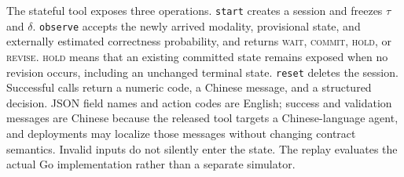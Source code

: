 \documentclass[journal]{IEEEtran}
\begin{document}
The stateful tool exposes three operations. \texttt{start} creates a session and freezes $\tau$ and $\delta$. \texttt{observe} accepts the newly arrived modality, provisional state, and externally estimated correctness probability, and returns \textsc{wait}, \textsc{commit}, \textsc{hold}, or \textsc{revise}. \textsc{hold} means that an existing committed state remains exposed when no revision occurs, including an unchanged terminal state. \texttt{reset} deletes the session. Successful calls return a numeric code, a Chinese message, and a structured decision. JSON field names and action codes are English; success and validation messages are Chinese because the released tool targets a Chinese-language agent, and deployments may localize those messages without changing contract semantics. Invalid inputs do not silently enter the state. The replay evaluates the actual Go implementation rather than a separate simulator.


\begingroup
\let\footnotesize\scriptsize


\endgroup
\end{document}
